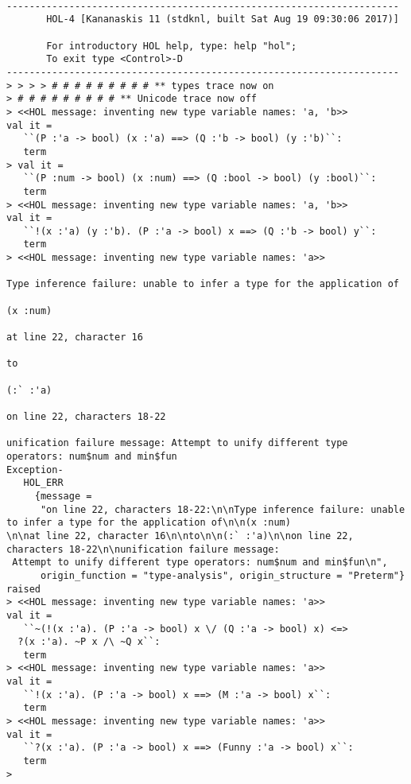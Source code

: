 \documentclass{report}
\begin{document}
\setcounter{sessioncount}{0}
\begin{session}
  \begin{scriptsize}
\begin{verbatim}

---------------------------------------------------------------------
       HOL-4 [Kananaskis 11 (stdknl, built Sat Aug 19 09:30:06 2017)]

       For introductory HOL help, type: help "hol";
       To exit type <Control>-D
---------------------------------------------------------------------
> > > > # # # # # # # # # ** types trace now on
> # # # # # # # # # ** Unicode trace now off
> <<HOL message: inventing new type variable names: 'a, 'b>>
val it =
   ``(P :'a -> bool) (x :'a) ==> (Q :'b -> bool) (y :'b)``:
   term
> val it =
   ``(P :num -> bool) (x :num) ==> (Q :bool -> bool) (y :bool)``:
   term
> <<HOL message: inventing new type variable names: 'a, 'b>>
val it =
   ``!(x :'a) (y :'b). (P :'a -> bool) x ==> (Q :'b -> bool) y``:
   term
> <<HOL message: inventing new type variable names: 'a>>

Type inference failure: unable to infer a type for the application of

(x :num)

at line 22, character 16

to

(:` :'a)

on line 22, characters 18-22

unification failure message: Attempt to unify different type operators: num$num and min$fun
Exception-
   HOL_ERR
     {message =
      "on line 22, characters 18-22:\n\nType inference failure: unable to infer a type for the application of\n\n(x :num)
\n\nat line 22, character 16\n\nto\n\n(:` :'a)\n\non line 22, characters 18-22\n\nunification failure message:
 Attempt to unify different type operators: num$num and min$fun\n",
      origin_function = "type-analysis", origin_structure = "Preterm"} raised
> <<HOL message: inventing new type variable names: 'a>>
val it =
   ``~(!(x :'a). (P :'a -> bool) x \/ (Q :'a -> bool) x) <=>
  ?(x :'a). ~P x /\ ~Q x``:
   term
> <<HOL message: inventing new type variable names: 'a>>
val it =
   ``!(x :'a). (P :'a -> bool) x ==> (M :'a -> bool) x``:
   term
> <<HOL message: inventing new type variable names: 'a>>
val it =
   ``?(x :'a). (P :'a -> bool) x ==> (Funny :'a -> bool) x``:
   term
> 
 
\end{verbatim}
  \end{scriptsize}
\end{session}
\end{document}
